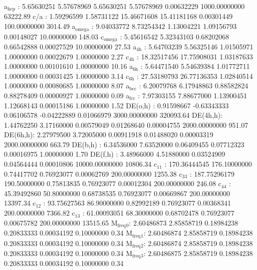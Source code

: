 \documentclass[11pt]{article}
\begin{document}
a\(_{\text{hcp}}\)   :   5.65630251   5.57678969   5.65630251   5.57678969   0.00632229 1000.00000000     63222.89
c/a     :   1.59296599   1.58731122  15.46671608  15.41181168   0.00301449 100.00000000      3014.49
a\(_{\text{omega}}\) :   9.04033772   8.73254342   1.13004221   1.09156793   0.00148027  10.00000000       148.03
c\(_{\text{omega}}\) :   5.45616542   5.32343103   0.68202068   0.66542888   0.00027529  10.00000000        27.53
a\(_{\text{4h}}\)    :   5.64703239   5.56325146   1.01505971   1.00000000   0.00022679   1.00000000         2.27
c\(_{\text{4h}}\)    :  18.32517456  17.75908031   1.03187633   1.00000000   0.00101610   1.00000000        10.16
a\(_{\text{6h}}\)    :   5.64471540   5.54639384   1.01772711   1.00000000   0.00031425   1.00000000         3.14
c\(_{\text{6h}}\)    :  27.53180793  26.77136353   1.02840514   1.00000000   0.00080685   1.00000000         8.07
a\(_{\text{bcc}}\)   :   6.20079768   6.17948863   0.88582824   0.88278409   0.00000927   1.00000000         0.09
a\(_{\text{fcc}}\)   :   7.97303155   7.88677000   1.13900451   1.12668143   0.00015186   1.00000000         1.52
DE(o,h) :   0.91598667  -0.63343333   0.06106578  -0.04222889   0.01066979 3000.00000000    320093.64
DE(4h,h):   1.44762250   3.17160000   0.00579049   0.01268640   0.00004755 2000.00000000       951.07
DE(6h,h):   2.27979500   3.72005000   0.00911918   0.01488020   0.00003319 2000.00000000       663.79
DE(b,h) :   6.34536000   7.63520000   0.06409455   0.07712323   0.00016975   1.00000000         1.70
DE(f,h) :   3.48966000   4.51880000   0.03524909   0.04564444   0.00010806 10000.00000000     10806.34
c\(_{\text{11}}\)    : 170.36444545 176.10000000   0.74417702   0.76923077   0.00062769 200.00000000      1255.38
c\(_{\text{33}}\)    : 187.75296179 190.50000000   0.75813835   0.76923077   0.00012304 200.00000000       246.08
c\(_{\text{44}}\)    :  45.39492860  50.80000000   0.68738535   0.76923077   0.00669867 200.00000000     13397.34
c\(_{\text{12}}\)    :  93.75627563  86.90000000   0.82992189   0.76923077   0.00368341 200.00000000      7366.82
c\(_{\text{13}}\)    :  61.00093051  68.30000000   0.68702478   0.76923077   0.00675782 200.00000000     13515.65
M\(_{\text{freq}}\)\(_{\text{0}}\):   2.60486873   2.85858719   0.18984238   0.20833333   0.00034192   0.10000000         0.34
M\(_{\text{freq}}\)\(_{\text{1}}\):   2.60486874   2.85858719   0.18984238   0.20833333   0.00034192   0.10000000         0.34
M\(_{\text{freq}}\)\(_{\text{2}}\):   2.60486874   2.85858719   0.18984238   0.20833333   0.00034192   0.10000000         0.34
M\(_{\text{freq}}\)\(_{\text{3}}\):   2.60486875   2.85858719   0.18984238   0.20833333   0.00034192   0.10000000         0.34
\end{document}

